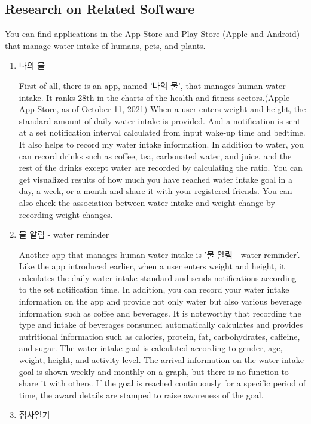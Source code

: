 \documentclass[conference]{IEEEtran}
\begin{document}
\subsection{Research on Related Software}
\setlength{\parindent}{2ex}
You can find applications in the App Store and Play Store (Apple and Android) that manage water intake of humans, pets, and plants.\\
\begin{enumerate}
\setlength{\parindent}{2ex}
\setlength{\parskip}{0.5em}
\item 나의 물 

First of all, there is an app, named '나의 물', that manages human water intake. It ranks 28th in the charts of the health and fitness sectors.(Apple App Store, as of October 11, 2021) When a user enters weight and height, the standard amount of daily water intake is provided. And a notification is sent at a set notification interval calculated from input wake-up time and bedtime. It also helps to record my water intake information. In addition to water, you can record drinks such as coffee, tea, carbonated water, and juice, and the rest of the drinks except water are recorded by calculating the ratio. You can get visualized results of how much you have reached water intake goal in a day, a week, or a month and share it with your registered friends. You can also check the association between water intake and weight change by recording weight changes.
\item 물 알림 - water reminder 

Another app that manages human water intake is '물 알림 - water reminder'. Like the app introduced earlier, when a user enters weight and height, it calculates the daily water intake standard and sends notifications according to the set notification time. In addition, you can record your water intake information on the app and provide not only water but also various beverage information such as coffee and beverages. It is noteworthy that recording the type and intake of beverages consumed automatically calculates and provides nutritional information such as calories, protein, fat, carbohydrates, caffeine, and sugar. The water intake goal is calculated according to gender, age, weight, height, and activity level. The arrival information on the water intake goal is shown weekly and monthly on a graph, but there is no function to share it with others. If the goal is reached continuously for a specific period of time, the award details are stamped to raise awareness of the goal.
\item 집사일기


\end{enumerate}
\end{document}
